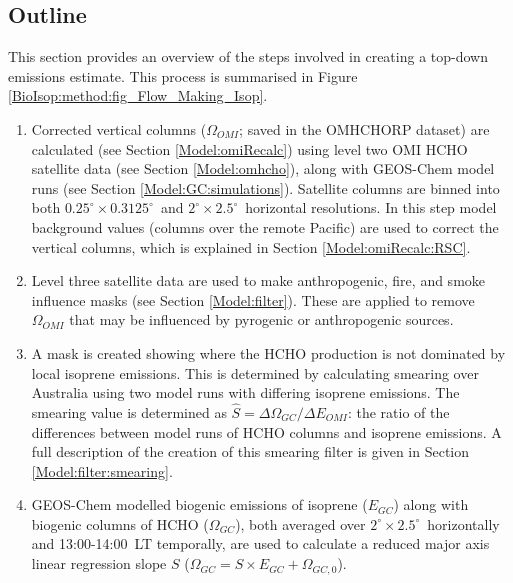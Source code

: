 \documentclass[acp, manuscript]{copernicus}
\newcommand{\Oomi}{\Omega_{OMI}} %
\newcommand{\Ogc}{\Omega_{GC}}  %
\newcommand{\apri}{E_{GC}} %
\newcommand{\apost}{E_{OMI}} %
\newcommand{\lowhr}{$2^{\circ} \times 2.5^{\circ}$}
\newcommand{\highhr}{$0.25^{\circ} \times 0.3125^{\circ}$}
\begin{document}
  \subsection{Outline}
    \label{BioIsop:method:outline}
    This section provides an overview of the steps involved in creating a top-down emissions estimate. %
    This process is summarised in Figure \ref{BioIsop:method:fig_Flow_Making_Isop}.
    \begin{enumerate}
      \item 
        Corrected vertical columns ($\Oomi$; saved in the OMHCHORP dataset) are calculated (see Section \ref{Model:omiRecalc}) using level two OMI HCHO satellite data (see Section \ref{Model:omhcho}), along with GEOS-Chem model runs (see Section \ref{Model:GC:simulations}).
        Satellite columns are binned into both \highhr ~and \lowhr ~horizontal resolutions.
        In this step model background values (columns over the remote Pacific) are used to correct the vertical columns, which is explained in Section \ref{Model:omiRecalc:RSC}.
      \item 
        Level three satellite data are used to make anthropogenic, fire, and smoke influence masks (see Section \ref{Model:filter}).
        These are applied to remove $\Oomi$ that may be influenced by pyrogenic or anthropogenic sources. 
      \item
        A mask is created showing where the HCHO production is not dominated by local isoprene emissions. 
        This is determined by calculating smearing over Australia using two model runs with differing isoprene emissions.
        The smearing value is determined as $\hat{S}=\Delta \Ogc/ \Delta \apost$: the ratio of the differences between model runs of HCHO columns and isoprene emissions.
        A full description of the creation of this smearing filter is given in Section \ref{Model:filter:smearing}.
      \item 
        GEOS-Chem modelled biogenic emissions of isoprene ($\apri$) along with biogenic columns of HCHO ($\Ogc$), both averaged over \lowhr ~horizontally and 13:00-14:00~LT temporally, are used to calculate a reduced major axis linear regression slope $S$ ($\Ogc=S \times \apri + \Omega_{GC,0}$).

\end{enumerate}
\end{document}
